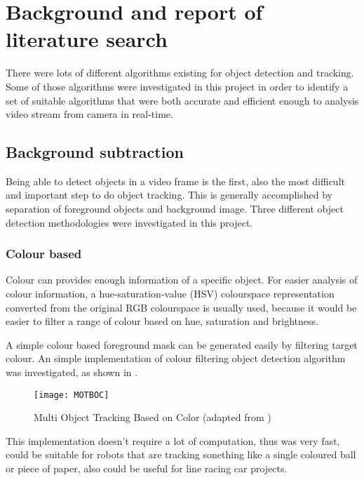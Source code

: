 \chapter{Background and report of literature search}

There were lots of different algorithms existing for object detection and tracking. Some of those algorithms were investigated in this project in order to identify a set of suitable algorithms that were both accurate and efficient enough to analysis video stream from camera in real-time.

\section{Background subtraction}

Being able to detect objects in a video frame is the first, also the most difficult and important step to do object tracking. This is generally accomplished by separation of foreground objects and background image. Three different object detection methodologies were investigated in this project.

\subsection{Colour based}

Colour can provides enough information of a specific object. For easier analysis of colour information, a hue-saturation-value (HSV) colourspace \cite[p.~301]{colourspace} representation converted from the original RGB colourspace is usually used, because it would be easier to filter a range of colour based on hue, saturation and brightness.

A simple colour based foreground mask can be generated easily by filtering target colour. An simple implementation \cite{MOTBOC.git} of colour filtering object detection algorithm was investigated, as shown in .

\begin{figure}[H]
  \centering
  \texttt{[image: MOTBOC]}
  \caption{Multi Object Tracking Based on Color (adapted from \cite{MOTBOC.git})}
  \label{Figure:MOTBOC}
\end{figure}

This implementation doesn't require a lot of computation, thus was very fast, could be suitable for robots that are tracking sonething like a single coloured ball or piece of paper, also could be useful for line racing car projects.

